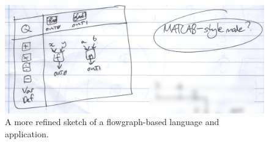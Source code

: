 \documentclass[12pt,twoside,notitlepage,xetex]{report}
\begin{document}
\begin{center}
\begin{figure}[H]
\begin{center}
\includegraphics[width=\textwidth]{figs/mockups/sketches/11/11jii.jpg}
\end{center}
\caption{A more refined sketch of a flowgraph-based language and application.}
\label{fig:Flows2}
\end{figure}
\end{center}
\end{document}
